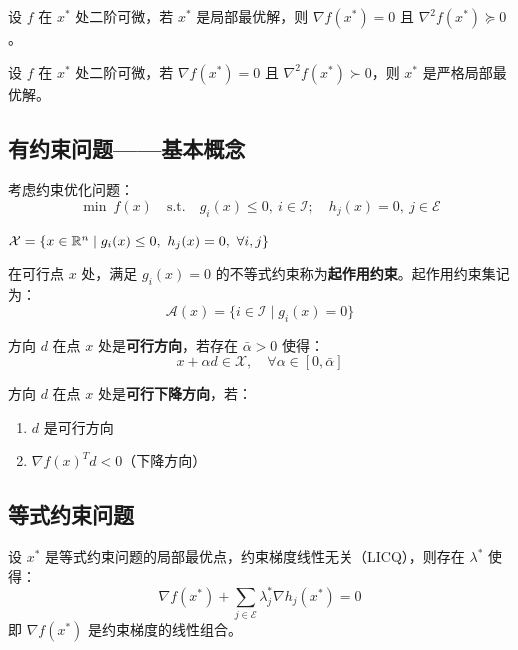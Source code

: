 \begin{theorem}[无约束二阶必要条件]
设 $f$ 在 $x^*$ 处二阶可微，若 $x^*$ 是局部最优解，则 $\nabla f(x^*) = 0$ 且 $\nabla^2 f(x^*) \succeq 0$。
\end{theorem}

\begin{theorem}[无约束二阶充分条件]
设 $f$ 在 $x^*$ 处二阶可微，若 $\nabla f(x^*) = 0$ 且 $\nabla^2 f(x^*) \succ 0$，则 $x^*$ 是严格局部最优解。
\end{theorem}

\subsection{有约束问题——基本概念}

考虑约束优化问题：
\[
\min\ f(x)\quad \text{s.t.}\quad g_i(x) \leq 0,\ i \in \mathcal{I};\quad h_j(x) = 0,\ j \in \mathcal{E}
\]

\begin{definition}[可行域]
$\mathcal{X} = \{x \in \mathbb{R}^n \mid g_i(x) \leq 0,\ h_j(x) = 0,\ \forall i, j\}$
\end{definition}

\begin{definition}
在可行点 $x$ 处，满足 $g_i(x) = 0$ 的不等式约束称为\textbf{起作用约束}。起作用约束集记为：
\[
\mathcal{A}(x) = \{i \in \mathcal{I} \mid g_i(x) = 0\}
\]
\end{definition}

\begin{definition}[可行方向]
方向 $d$ 在点 $x$ 处是\textbf{可行方向}，若存在 $\bar{\alpha} > 0$ 使得：
\[
x + \alpha d \in \mathcal{X},\quad \forall \alpha \in [0, \bar{\alpha}]
\]
\end{definition}

\begin{definition}[可行下降方向]
方向 $d$ 在点 $x$ 处是\textbf{可行下降方向}，若：
\begin{enumerate}[label=(\arabic*)]
    \item $d$ 是可行方向
    \item $\nabla f(x)^T d < 0$（下降方向）
\end{enumerate}
\end{definition}

\subsection{等式约束问题}

\begin{theorem}[等式约束的一阶条件]
设 $x^*$ 是等式约束问题的局部最优点，约束梯度线性无关（LICQ），则存在 $\lambda^*$ 使得：
\[
\nabla f(x^*) + \sum_{j \in \mathcal{E}} \lambda_j^* \nabla h_j(x^*) = 0
\]
即 $\nabla f(x^*)$ 是约束梯度的线性组合。
\end{theorem}

